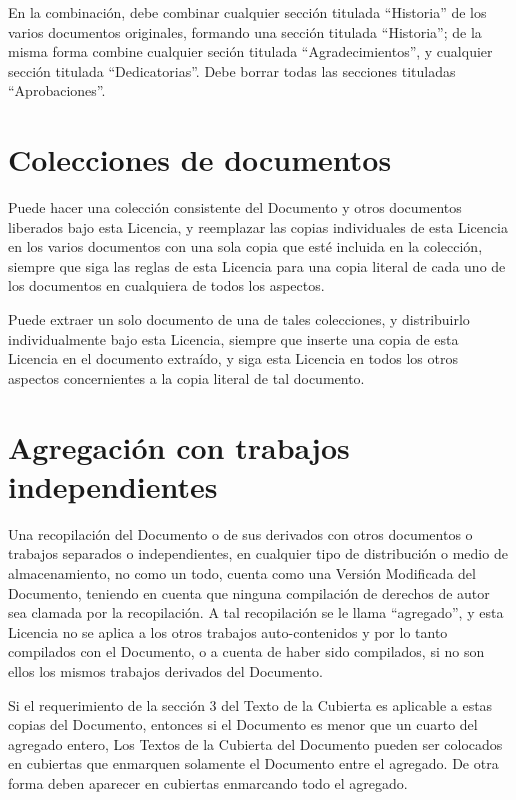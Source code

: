 En   la  combinación,   debe  combinar   cualquier  sección   titulada
``Historia''  de  los  varios   documentos  originales,  formando  una
sección  titulada ``Historia'';  de la  misma forma  combine cualquier
seción  titulada  ``Agradecimientos'',  y cualquier  sección  titulada
``Dedicatorias''.   Debe   borrar   todas  las   secciones   tituladas
``Aprobaciones''.

\section{Colecciones de documentos}

Puede hacer una colección consistente del Documento y otros documentos
liberados bajo esta Licencia, y  reemplazar las copias individuales de
esta Licencia  en los varios  documentos con  una sola copia  que esté
incluida en la colección, siempre que siga las reglas de esta Licencia
para una copia literal de cada  uno de los documentos en cualquiera de
todos los aspectos.

Puede  extraer  un solo  documento  de  una  de tales  colecciones,  y
distribuirlo individualmente  bajo esta Licencia, siempre  que inserte
una  copia de  esta Licencia  en el  documento extraído,  y siga  esta
Licencia en todos los otros  aspectos concernientes a la copia literal
de tal documento.

\section{Agregación con trabajos independientes}

Una  recopilación  del   Documento  o  de  sus   derivados  con  otros
documentos o trabajos separados o independientes, en cualquier tipo de
distribución o medio  de almacenamiento, no como un  todo, cuenta como
una Versión Modificada  del Documento, teniendo en  cuenta que ninguna
compilación de  derechos de autor  sea clamada por la  recopilación. A
tal  recopilación se  le llama  ``agregado'',  y esta  Licencia no  se
aplica a los otros trabajos  auto-contenidos y por lo tanto compilados
con el Documento, o a cuenta de haber sido compilados, si no son ellos
los mismos trabajos derivados del Documento.

Si  el requerimiento  de la  sección  3 del  Texto de  la Cubierta  es
aplicable a  estas copias del  Documento, entonces si el  Documento es
menor que un cuarto del agregado entero, Los Textos de la Cubierta del
Documento pueden ser colocados en cubiertas que enmarquen solamente el
Documento entre el agregado. De otra forma deben aparecer en cubiertas
enmarcando todo el agregado.

